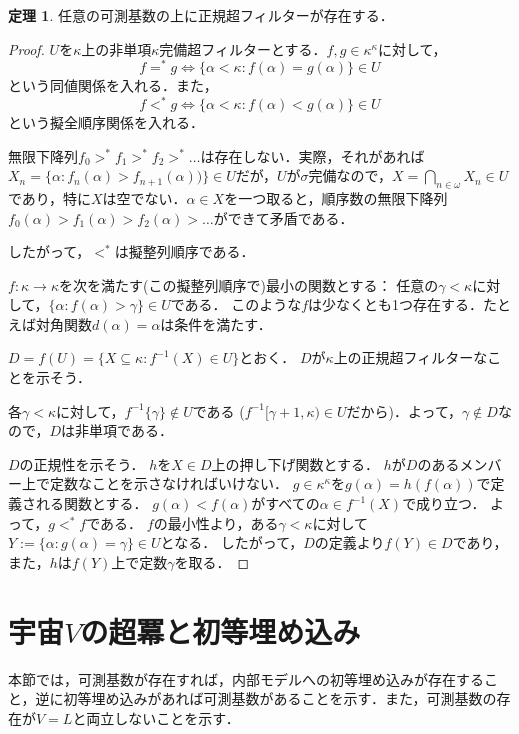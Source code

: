 \documentclass[uplatex]{jsarticle}
\renewcommand\subset{\subseteq}
\theoremstyle{definition}
\newtheorem{thm}{定理}[section]
\begin{document}
	\begin{thm}
		任意の可測基数の上に正規超フィルターが存在する．
	\end{thm}
	\begin{proof}
		$U$を$\kappa$上の非単項$\kappa$完備超フィルターとする．$f, g \in \kappa^\kappa$に対して，
		\[
		f =^* g \iff \{ \alpha < \kappa : f(\alpha) = g(\alpha)\} \in U
		\]
		という同値関係を入れる．また，
		\[
		f <^* g \iff \{ \alpha < \kappa : f(\alpha) < g(\alpha)\} \in U
		\]
		という擬全順序関係を入れる．
		
		無限下降列$f_0 >^* f_1 >^* f_2 >^* \dots$は存在しない．実際，それがあれば$X_n = \{ \alpha : f_n(\alpha) > f_{n+1}(\alpha))\} \in U$だが，$U$が$\sigma$完備なので，$X = \bigcap_{n \in \omega} X_n \in U$であり，特に$X$は空でない．$\alpha \in X$を一つ取ると，順序数の無限下降列$f_0(\alpha) > f_1(\alpha) > f_2(\alpha) > \dots$ができて矛盾である．
		
		したがって，$<^*$は擬整列順序である．
		
		$f \colon \kappa \to \kappa$を次を満たす(この擬整列順序で)最小の関数とする：
		任意の$\gamma < \kappa$に対して，$\{\alpha : f(\alpha) > \gamma \} \in U$である．
		このような$f$は少なくとも1つ存在する．たとえば対角関数$d(\alpha) = \alpha$は条件を満たす．
		
		$D = f(U) = \{ X \subset \kappa : f^{-1}(X) \in U \}$とおく．
		$D$が$\kappa$上の正規超フィルターなことを示そう．
		
		各$\gamma < \kappa$に対して，$f^{-1}\{\gamma\} \not \in U$である ($f^{-1}[\gamma+1, \kappa) \in U$だから)．よって，$\gamma \not \in D$なので，$D$は非単項である．
		
		$D$の正規性を示そう．
		$h$を$X \in D$上の押し下げ関数とする．
		$h$が$D$のあるメンバー上で定数なことを示さなければいけない．
		$g \in \kappa^\kappa$を$g(\alpha) = h(f(\alpha))$で定義される関数とする．
		$g(\alpha) < f(\alpha)$がすべての$\alpha \in f^{-1}(X)$で成り立つ．
		よって，$g <^* f$である．
		$f$の最小性より，ある$\gamma < \kappa$に対して $Y := \{ \alpha : g(\alpha) = \gamma\} \in U$となる．
		したがって，$D$の定義より$f(Y) \in D$であり，また，$h$は$f(Y)$上で定数$\gamma$を取る．
	\end{proof}
	
	\section{宇宙$V$の超冪と初等埋め込み}
	
	本節では，可測基数が存在すれば，内部モデルへの初等埋め込みが存在すること，逆に初等埋め込みがあれば可測基数があることを示す．また，可測基数の存在が$V=L$と両立しないことを示す．
	
\end{document}
